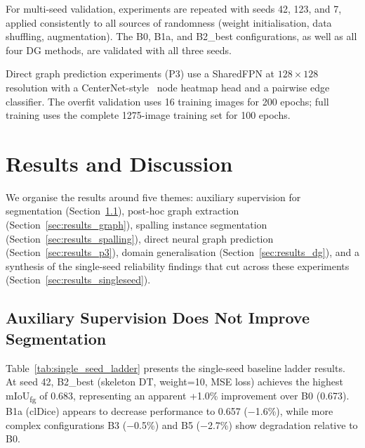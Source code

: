 \documentclass[preprint,12pt]{elsarticle}
\begin{document}
For multi-seed validation, experiments are repeated with seeds 42, 123, and 7, applied consistently to all sources of randomness (weight initialisation, data shuffling, augmentation). The B0, B1a, and B2\_best configurations, as well as all four DG methods, are validated with all three seeds.

Direct graph prediction experiments (P3) use a SharedFPN at $128 \times 128$ resolution with a CenterNet-style~\cite{zhou2019centernet} node heatmap head and a pairwise edge classifier. The overfit validation uses 16 training images for 200 epochs; full training uses the complete 1275-image training set for 100 epochs.



\section{Results and Discussion}
\label{sec:results}

We organise the results around five themes: auxiliary supervision for segmentation (Section~\ref{sec:results_aux}), post-hoc graph extraction (Section~\ref{sec:results_graph}), spalling instance segmentation (Section~\ref{sec:results_spalling}), direct neural graph prediction (Section~\ref{sec:results_p3}), domain generalisation (Section~\ref{sec:results_dg}), and a synthesis of the single-seed reliability findings that cut across these experiments (Section~\ref{sec:results_singleseed}).

\subsection{Auxiliary Supervision Does Not Improve Segmentation}
\label{sec:results_aux}

Table~\ref{tab:single_seed_ladder} presents the single-seed baseline ladder results. At seed 42, B2\_best (skeleton DT, weight=10, MSE loss) achieves the highest mIoU\textsubscript{fg} of 0.683, representing an apparent +1.0\% improvement over B0 (0.673). B1a (clDice) appears to decrease performance to 0.657 ($-$1.6\%), while more complex configurations B3 ($-$0.5\%) and B5 ($-$2.7\%) show degradation relative to B0.
\end{document}
